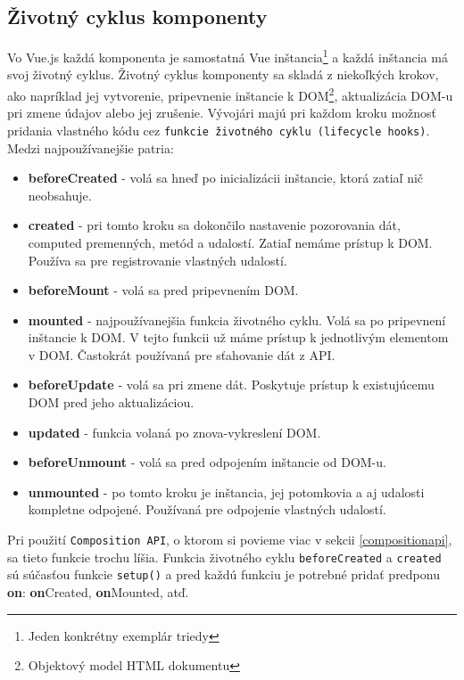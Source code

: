 \subsection*{Životný cyklus komponenty}
Vo Vue.js každá komponenta je samostatná Vue inštancia\footnote{Jeden konkrétny exemplár triedy} a každá inštancia má svoj životný cyklus. Životný cyklus komponenty sa skladá z niekoľkých krokov, ako napríklad jej vytvorenie, pripevnenie inštancie k DOM\footnote{Objektový model HTML dokumentu}, aktualizácia DOM-u pri zmene údajov alebo jej zrušenie. Vývojári majú pri každom kroku možnosť pridania vlastného kódu cez \texttt{funkcie životného cyklu (lifecycle hooks)}. Medzi najpoužívanejšie patria:
    \begin{itemize}
        \item\textbf{beforeCreated} - volá sa hneď po inicializácii inštancie, ktorá zatiaľ nič neobsahuje.
        \item\textbf{created} - pri tomto kroku sa dokončilo nastavenie pozorovania dát, computed premenných, metód a udalostí. Zatiaľ nemáme prístup k DOM. Používa sa pre registrovanie vlastných udalostí.
        \item\textbf{beforeMount} - volá sa pred pripevnením DOM.
        \item\textbf{mounted} - najpoužívanejšia funkcia životného cyklu. Volá sa po pripevnení inštancie k DOM. V tejto funkcii už máme prístup k jednotlivým elementom v DOM. Častokrát používaná pre sťahovanie dát z API.
        \item\textbf{beforeUpdate} - volá sa pri zmene dát. Poskytuje prístup k existujúcemu DOM pred jeho aktualizáciou.
        \item\textbf{updated} - funkcia volaná po znova-vykreslení DOM.
        \item\textbf{beforeUnmount} - volá sa pred odpojením inštancie od DOM-u.
        \item\textbf{unmounted} - po tomto kroku je inštancia, jej potomkovia a aj udalosti kompletne odpojené. Používaná pre odpojenie vlastných udalostí.
    \end{itemize}

Pri použití \texttt{Composition API}, o ktorom si povieme viac v sekcii \ref{compositionapi}, sa tieto funkcie trochu líšia. Funkcia životného cyklu \texttt{beforeCreated} a \texttt{created} sú súčasťou funkcie \texttt{setup()} a pred každú funkciu je potrebné pridať predponu \textbf{on}: \textbf{on}Created, \textbf{on}Mounted, atď. 

